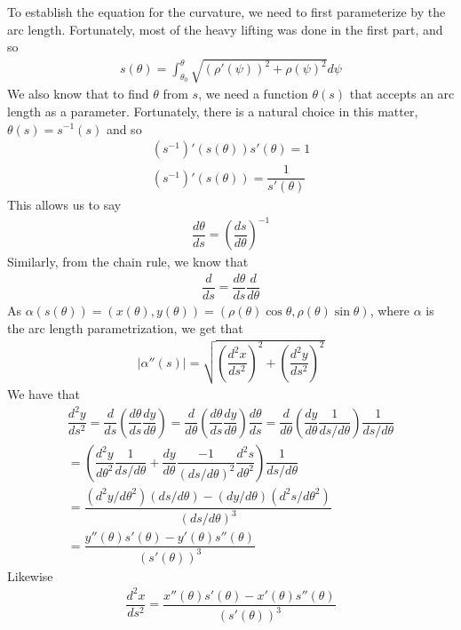 \documentclass{article}
\begin{document}
	To establish the equation for the curvature, we need to first parameterize by the arc length. Fortunately, most of the heavy lifting was done in the first part, and so
	\begin{gather*}
		s(\theta) = \int_{\theta_0}^{\theta} \sqrt{ (\rho'(\psi))^2 + \rho(\psi)^2 } d\psi
	\end{gather*}
	We also know that to find $\theta$ from $s$, we need a function $\theta(s)$ that accepts an arc length as a parameter. Fortunately, there is a natural choice in this matter, $\theta(s) = s^{-1}(s)$ and so
	\begin{gather*}
		(s^{-1})'(s(\theta)) s'(\theta) = 1 \\
		(s^{-1})'(s(\theta)) = \dfrac{1}{s'(\theta)}
	\end{gather*}
	This allows us to say
	\begin{gather*}
		\dfrac{d\theta}{ds} = \left( \dfrac{ds}{d\theta} \right)^{-1}
	\end{gather*}
	Similarly, from the chain rule, we know that
	\begin{gather*}
		\dfrac{d}{ds} = \dfrac{d\theta}{ds} \dfrac{d}{d\theta}
	\end{gather*} 
	As $\alpha(s(\theta)) = (x(\theta), y(\theta)) = (\rho(\theta) \cos \theta, \rho(\theta) \sin \theta)$, where $\alpha$ is the arc length parametrization, we get that
	\begin{gather*}
		\left| \alpha''(s) \right| = \sqrt{ \left( \dfrac{d^2x}{ds^2} \right)^2 + \left( \dfrac{d^2y}{ds^2} \right)^2 }
	\end{gather*}
	We have that
	\begin{gather*}
		\dfrac{d^2y}{ds^2} = \dfrac{d}{ds} \left( \dfrac{d\theta}{ds} \dfrac{dy}{d\theta} \right)
		= \dfrac{d}{d\theta} \left( \dfrac{d\theta}{ds} \dfrac{dy}{d\theta} \right) \dfrac{d\theta}{ds}
		= \dfrac{d}{d\theta} \left( \dfrac{dy}{d\theta} \dfrac{1}{ds/d\theta} \right) \dfrac{1}{ds/d\theta} \\
		= \left( \dfrac{d^2y}{d\theta^2} \dfrac{1}{ds/d\theta} + \dfrac{dy}{d\theta} \dfrac{-1}{(ds/d\theta)^2} \dfrac{d^2s}{d\theta^2} \right) \dfrac{1}{ds/d\theta} \\
		= \dfrac{ (d^2y/d\theta^2)(ds/d\theta) - (dy/d\theta)(d^2s/d\theta^2) }{ (ds/d\theta)^3 } \\
		= \dfrac{y''(\theta) s'(\theta) - y'(\theta) s''(\theta)}{ (s'(\theta))^3 }
	\end{gather*}
	Likewise
	\begin{gather*}
		\dfrac{d^2x}{ds^2} = \dfrac{x''(\theta) s'(\theta) - x'(\theta) s''(\theta)}{ (s'(\theta))^3 }
	\end{gather*}
\end{document}
